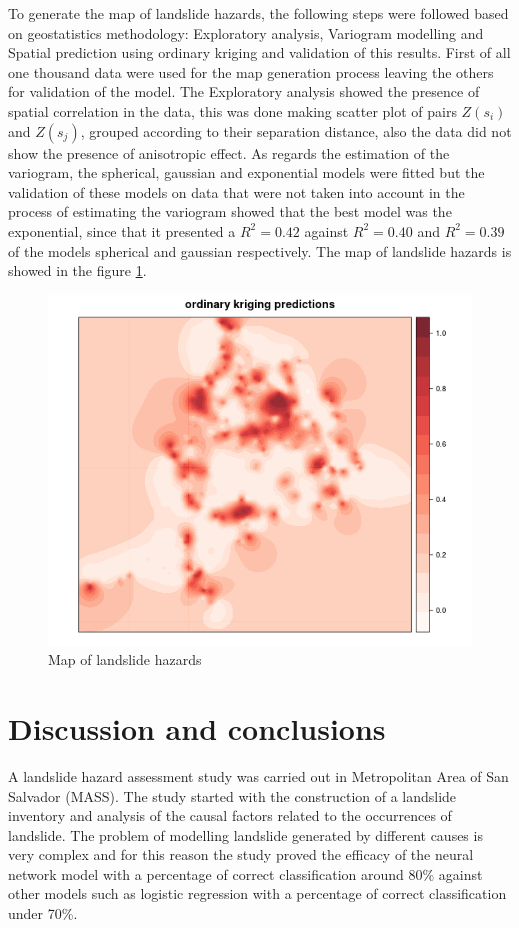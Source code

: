 \documentclass[11pt,twoside]{rmta2010esp}%
\begin{document}
To generate the map of landslide hazards, the following steps were followed based on geostatistics methodology: Exploratory analysis, Variogram modelling and Spatial prediction using ordinary kriging and validation of this results. 
First of all one thousand data were used for the map generation process leaving the others for validation of the model. The Exploratory analysis showed the presence of spatial correlation in the data, this was done making scatter plot of pairs $Z(s_{i})$ and  $Z(s_{j})$, grouped according to their separation distance, also the data did not show the presence of anisotropic effect. As regards the estimation of the variogram, the spherical, gaussian and exponential models were fitted but the validation of these models on data that were not taken into account in the process of estimating the variogram showed that the best model was the exponential, since that it presented a $ R^{2} = 0.42 $ against $ R^{2} = 0.40 $ and $ R^{2} = 0.39 $ of the models spherical and gaussian respectively. The map of landslide hazards is showed in the figure \ref{fig:img02}.

 \begin{center}
  \begin{figure}[H]
   \centering
   \includegraphics[scale=0.40]{img02}
   \caption{\small{Map of landslide hazards}}
   \label{fig:img02}
  \end{figure}
 \end{center}


\section{Discussion and conclusions}
A landslide hazard assessment study was carried out in Metropolitan Area of San Salvador (MASS). The study started with the construction of a landslide inventory and analysis of the causal factors related to the occurrences of landslide. The problem of modelling landslide generated by different causes is very complex and for this reason the study proved the efficacy of the neural network model with a percentage of correct classification around 80\% against other models such as logistic regression with a percentage of correct classification under 70\%. 
\end{document}
